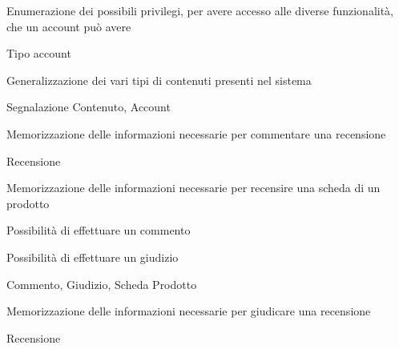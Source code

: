 
{\begin{itemWork}
	\item Enumerazione dei possibili privilegi, per avere accesso alle diverse funzionalità, che un account può avere
\end{itemWork}}
{\begin{itemWork}
	\item Tipo account
\end{itemWork}}


{\begin{itemWork}
	\item Generalizzazione dei vari tipi di contenuti presenti nel sistema
\end{itemWork}}
{\begin{itemWork}
	\item Segnalazione Contenuto, Account
\end{itemWork}}


{\begin{itemWork}
	\item Memorizzazione delle informazioni necessarie per commentare una recensione
\end{itemWork}}
{\begin{itemWork}
	\item Recensione
\end{itemWork}}


{\begin{itemWork}
	\item Memorizzazione delle informazioni necessarie per recensire una scheda di un prodotto
	\item Possibilità di effettuare un commento
	\item Possibilità di effettuare un giudizio
\end{itemWork}}
{\begin{itemWork}
	\item Commento, Giudizio, Scheda Prodotto
\end{itemWork}}


{\begin{itemWork}
	\item Memorizzazione delle informazioni necessarie per giudicare una recensione
\end{itemWork}}
{\begin{itemWork}
	\item Recensione
\end{itemWork}}

